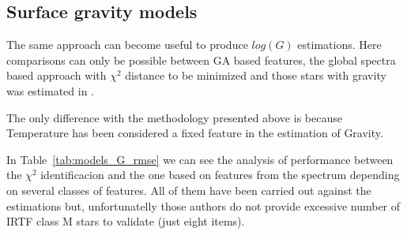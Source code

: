 %
% 


%

\subsection{Surface gravity models}

The same approach can become useful to produce $log(G)$ estimations. 
Here comparisons can only be possible between GA based features, the 
global spectra based approach with $\chi^2$ distance
to be minimized and those stars with gravity was 
estimated in  \cite{2013A&A...549A.129C}.

The only difference with the methodology presented above is because
Temperature has been considered a fixed feature in the estimation of 
Gravity.

In Table~\ref{tab:models_G_rmse} 
we can see the analysis of performance between
the $\chi^2$ identificacion and the one based on features from the spectrum
depending on several classes of features. All of them have been carried out
against the \cite{Cesetti} estimations but, unfortunatelly those authors 
do not provide excessive number of IRTF class M stars to validate (just eight items).

